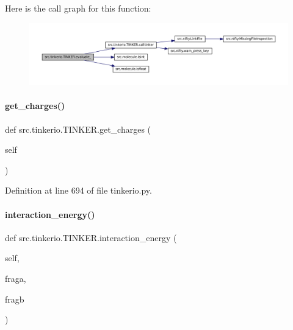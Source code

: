 Here is the call graph for this function\+:
\nopagebreak
\begin{figure}[H]
\begin{center}
\leavevmode
\includegraphics[width=350pt]{classsrc_1_1tinkerio_1_1TINKER_a49a7d06296ee436a170ebc13e518e7f6_cgraph}
\end{center}
\end{figure}
\mbox{\label{classsrc_1_1tinkerio_1_1TINKER_a56287fffe8be5d965974fa252347bf2c}} 
\paragraph{\texorpdfstring{get\+\_\+charges()}{get\_charges()}}
{\footnotesize\ttfamily def src.\+tinkerio.\+T\+I\+N\+K\+E\+R.\+get\+\_\+charges (\begin{DoxyParamCaption}\item[{}]{self }\end{DoxyParamCaption})}



Definition at line 694 of file tinkerio.\+py.

\mbox{\label{classsrc_1_1tinkerio_1_1TINKER_a16f711409a34ee914ac3c9561907bc58}} 
\paragraph{\texorpdfstring{interaction\+\_\+energy()}{interaction\_energy()}}
{\footnotesize\ttfamily def src.\+tinkerio.\+T\+I\+N\+K\+E\+R.\+interaction\+\_\+energy (\begin{DoxyParamCaption}\item[{}]{self,  }\item[{}]{fraga,  }\item[{}]{fragb }\end{DoxyParamCaption})}




